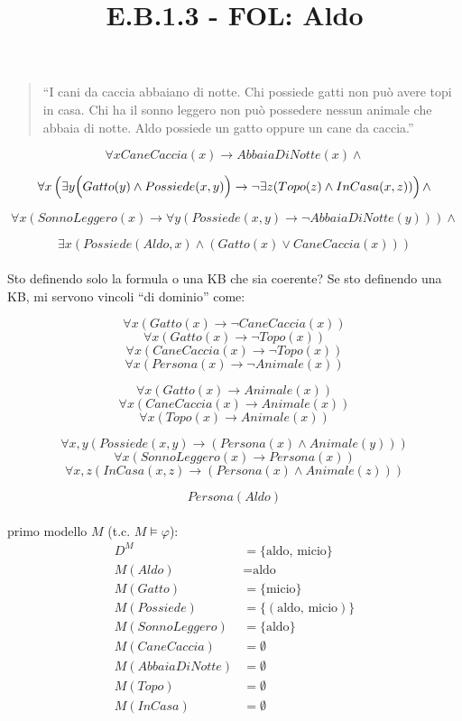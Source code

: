 \documentclass[12pt]{article}
\title{E.B.1.3 - FOL: Aldo}
\author{}
\date{}
\begin{document}
\maketitle
\vspace{-5em}

\begin{quote}
``I cani da caccia abbaiano di notte. Chi possiede gatti non può avere topi in
casa. Chi ha il sonno leggero non può possedere nessun animale che abbaia
di notte. Aldo possiede un gatto oppure un cane da caccia.''
\end{quote}


$$
\forall x CaneCaccia(x) \to AbbaiaDiNotte(x) \land
$$

$$
\forall x \left(\exists y \large\bigl( Gatto(y) \land Possiede(x, y)\bigr)  \to \neg \exists z (Topo(z) \land InCasa(x, z)) \right) \land
$$

$$
\forall x (SonnoLeggero(x) \to \forall y (Possiede (x, y) \to \neg AbbaiaDiNotte(y)) ) \land
$$

$$
\exists x (Possiede(Aldo, x) \land (Gatto(x) \lor CaneCaccia(x))) 
$$


\paragraph{}
Sto definendo solo la formula o una KB che sia coerente? Se sto definendo una KB, mi servono vincoli ``di dominio'' come:

$$\forall x (Gatto(x) \to \neg CaneCaccia(x))$$
$$\forall x (Gatto(x) \to \neg Topo(x))$$
$$\forall x (CaneCaccia(x) \to \neg Topo(x))$$
$$\forall x (Persona(x) \to \neg Animale(x))$$

$$\forall x (Gatto(x) \to Animale(x))$$
$$\forall x (CaneCaccia(x) \to Animale(x))$$
$$\forall x (Topo(x) \to Animale(x))$$

$$\forall x, y (Possiede(x, y) \to (Persona(x) \land Animale(y)))$$
$$\forall x (SonnoLeggero(x) \to Persona(x))$$
$$\forall x, z (InCasa(x, z) \to (Persona(x) \land Animale(z)))$$

$$Persona(Aldo)$$

\paragraph{}

primo modello $M$ (t.c. $M \models \varphi$):
\begin{align*}
D^M &= \{ \text{aldo, micio} \} \\
M(Aldo) &= \text{aldo} \\
M(Gatto) &= \{ \text{micio} \} \\
M(Possiede) &= \{ (\text{aldo, micio}) \} \\
M(SonnoLeggero) &= \{ \text{aldo} \} \\
M(CaneCaccia) &= \emptyset \\
M(AbbaiaDiNotte) &= \emptyset \\
M(Topo) &= \emptyset \\
M(InCasa) &= \emptyset
\end{align*}
\end{document}
